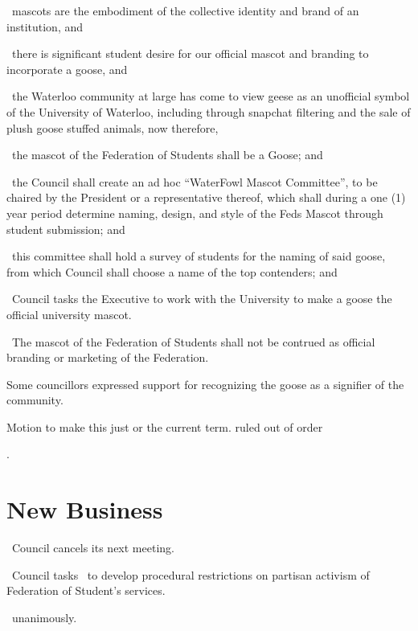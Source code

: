 \begin{motion}
    \whereas\ mascots are the embodiment of the collective identity and
    brand of an institution, and

    \whereas\ there is significant student desire for our official mascot
    and branding to incorporate a goose, and

    \whereas\ the Waterloo community at large has come to view geese as an
    unofficial symbol of the University of Waterloo, including through
    snapchat filtering and the sale of plush goose stuffed animals, now
    therefore,

    \birt\ the mascot of the Federation of Students shall be a Goose; and

    \bifrt\ the Council shall create an ad hoc “WaterFowl Mascot
    Committee”, to be chaired by the President or a representative
    thereof, which shall during a one (1) year period determine naming,
    design, and style of the Feds Mascot through student submission; and

    \bifrt\ this committee shall hold a survey of students for the naming
    of said goose, from which Council shall choose a name of the top
    contenders; and

    \bifrt\ Council tasks the Executive to work with the University to make
    a goose the official university mascot. 

    \bifrt\ The mascot of the Federation of Students shall not be contrued as
    official branding or marketing of the Federation.

    \movers{\seneca}{\jennifer}

    Some councillors expressed support for recognizing the goose as a signifier
    of the community.

    Motion to make this just or the current term. ruled out of order
    
    \carries. 
\end{motion}

\section*{New Business}

\begin{motion}
    \birt\ Council cancels its next meeting.
\end{motion}

\begin{motion}
    \birt\ Council tasks \ppc\ to develop procedural restrictions on partisan
    activism of Federation of Student's services.

    \movers{\seneca}{\katie}
    \carries\ unanimously.

\end{motion}

